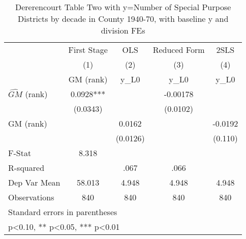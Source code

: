 \begin{table}[htbp]\centering
\def\sym#1{\ifmmode^{#1}\else\(^{#1}\)\fi}
\caption{Dererencourt Table Two with y=Number of Special Purpose Districts by decade in County 1940-70, with baseline y and division FEs}
\begin{tabular}{l*{4}{c}}
\toprule
                    & First Stage   &         OLS   &Reduced Form   &        2SLS   \\
                    &\multicolumn{1}{c}{(1)}&\multicolumn{1}{c}{(2)}&\multicolumn{1}{c}{(3)}&\multicolumn{1}{c}{(4)}\\
                    &\multicolumn{1}{c}{GM  (rank)}&\multicolumn{1}{c}{y\_L0}&\multicolumn{1}{c}{y\_L0}&\multicolumn{1}{c}{y\_L0}\\
\midrule
$\hat{GM}$ (rank)   &      0.0928***&               &    -0.00178   &               \\
                    &    (0.0343)   &               &    (0.0102)   &               \\
\addlinespace
GM  (rank)          &               &      0.0162   &               &     -0.0192   \\
                    &               &    (0.0126)   &               &     (0.110)   \\
\midrule
F-Stat              &       8.318   &               &               &               \\
R-squared           &               &        .067   &        .066   &               \\
Dep Var Mean        &      58.013   &       4.948   &       4.948   &       4.948   \\
Observations        &         840   &         840   &         840   &         840   \\
\bottomrule
\multicolumn{5}{l}{\footnotesize Standard errors in parentheses}\\
\multicolumn{5}{l}{\footnotesize * p<0.10, ** p<0.05, *** p<0.01}\\
\end{tabular}
\end{table}
